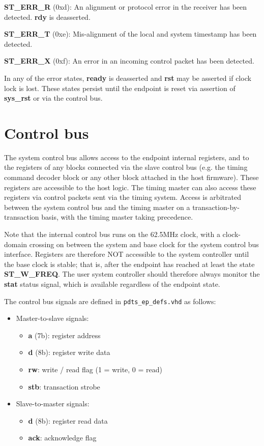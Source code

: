 \documentclass[fleqn,12pt,a4paper]{olplainarticle}
\begin{document}
\textbf{ST\_ERR\_R} (0xd): An alignment or protocol error in the receiver has been detected. \textbf{rdy} is deasserted.

\textbf{ST\_ERR\_T} (0xe): Mis-alignment of the local and system timestamp has been detected.

\textbf{ST\_ERR\_X} (0xf): An error in an incoming control packet has been detected.

In any of the error states, \textbf{ready} is deasserted and \textbf{rst} may be asserted if clock lock is lost. These states persist until the endpoint is reset via assertion of \textbf{sys\_rst} or via the control bus.

\section{Control bus}

The system control bus allows access to the endpoint internal
registers, and to the registers of any blocks connected via the slave
control bus (e.g. the timing command decoder block or any other block
attached in the host firmware). These registers are accessible to the
host logic. The timing master can also access these registers via
control packets sent via the timing system. Access is arbitrated
between the system control bus and the timing master on a
transaction-by-transaction basis, with the timing master taking
precedence.

Note that the internal control bus runs on the 62.5MHz clock, with a
clock-domain crossing on between the system and base clock for the
system control bus interface. Registers are therefore NOT accessible
to the system controller until the base clock is stable; that is,
after the endpoint has reached at least the state
\textbf{ST\_W\_FREQ}. The user system controller should therefore
always monitor the \textbf{stat} status signal, which is available
regardless of the endpoint state.

The control bus signals are defined in \texttt{pdts\_ep\_defs.vhd} as follows:

\begin{itemize}
\item Master-to-slave signals:
\begin{itemize}
\item \textbf{a} (7b): register address
\item \textbf{d} (8b): register write data
\item \textbf{rw}: write / read flag (1 = write, 0 = read)
\item \textbf{stb}: transaction strobe
\end{itemize}

\item Slave-to-master signals:
\begin{itemize}
\item \textbf{d} (8b): register read data
\item \textbf{ack}: acknowledge flag
\end{itemize}

\end{itemize}
\end{document}

